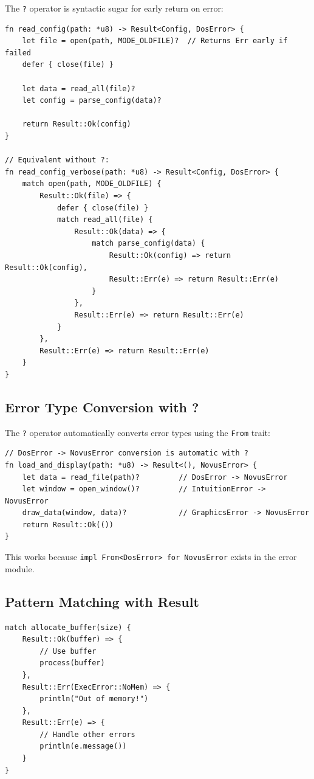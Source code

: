 The \texttt{?} operator is syntactic sugar for early return on error:

\begin{lstlisting}
fn read_config(path: *u8) -> Result<Config, DosError> {
    let file = open(path, MODE_OLDFILE)?  // Returns Err early if failed
    defer { close(file) }

    let data = read_all(file)?
    let config = parse_config(data)?

    return Result::Ok(config)
}

// Equivalent without ?:
fn read_config_verbose(path: *u8) -> Result<Config, DosError> {
    match open(path, MODE_OLDFILE) {
        Result::Ok(file) => {
            defer { close(file) }
            match read_all(file) {
                Result::Ok(data) => {
                    match parse_config(data) {
                        Result::Ok(config) => return Result::Ok(config),
                        Result::Err(e) => return Result::Err(e)
                    }
                },
                Result::Err(e) => return Result::Err(e)
            }
        },
        Result::Err(e) => return Result::Err(e)
    }
}
\end{lstlisting}

\subsection{Error Type Conversion with ?}

The \texttt{?} operator automatically converts error types using the \texttt{From} trait:

\begin{lstlisting}
// DosError -> NovusError conversion is automatic with ?
fn load_and_display(path: *u8) -> Result<(), NovusError> {
    let data = read_file(path)?         // DosError -> NovusError
    let window = open_window()?         // IntuitionError -> NovusError
    draw_data(window, data)?            // GraphicsError -> NovusError
    return Result::Ok(())
}
\end{lstlisting}

This works because \texttt{impl From<DosError> for NovusError} exists in the error module.

\subsection{Pattern Matching with Result}

\begin{lstlisting}
match allocate_buffer(size) {
    Result::Ok(buffer) => {
        // Use buffer
        process(buffer)
    },
    Result::Err(ExecError::NoMem) => {
        println("Out of memory!")
    },
    Result::Err(e) => {
        // Handle other errors
        println(e.message())
    }
}
\end{lstlisting}


